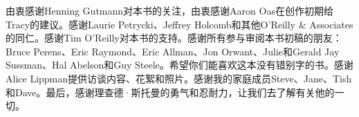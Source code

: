 \ifdefined\chs
由衷感谢Henning Gutmann对本书的关注，由衷感谢Aaron Oas在创作初期给Tracy的建议。感谢Laurie Petrycki、Jeffrey Holcomb和其他O’Reilly \& Associates的同仁。感谢Tim O’Reilly对本书的支持。感谢所有参与审阅本书初稿的朋友：Bruce Perens、Eric Raymond、Eric Allman、Jon Orwant、Julie和Gerald Jay Sussman、Hal Abelson和Guy Steele。希望你们能喜欢这本没有错别字的书。感谢Alice Lippman提供访谈内容、花絮和照片。感谢我的家庭成员Steve、Jane、Tish和Dave。最后，感谢理查德·斯托曼的勇气和忍耐力，让我们去了解有关他的一切。

\bigskip
{}
\fi

